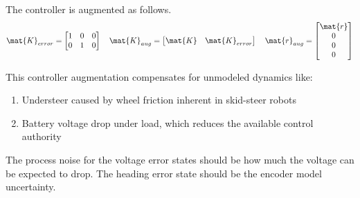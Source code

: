 The controller is augmented as follows.
\begin{equation}
  \mat{K}_{error} =
  \begin{bmatrix}
    1 & 0 & 0 \\
    0 & 1 & 0
  \end{bmatrix}
  \quad
  \mat{K}_{aug} = \begin{bmatrix}
    \mat{K} & \mat{K}_{error}
  \end{bmatrix}
  \quad
  \mat{r}_{aug} = \begin{bmatrix}
    \mat{r} \\
    0 \\
    0 \\
    0
  \end{bmatrix}
\end{equation}

This controller augmentation compensates for unmodeled dynamics like:
\begin{enumerate}
  \item Understeer caused by wheel friction inherent in skid-steer robots
  \item Battery voltage drop under load, which reduces the available control
    authority
\end{enumerate}
\begin{remark}
  The process noise for the voltage error states should be how much the voltage
  can be expected to drop. The heading error state should be the encoder
  \gls{model} uncertainty.
\end{remark}
